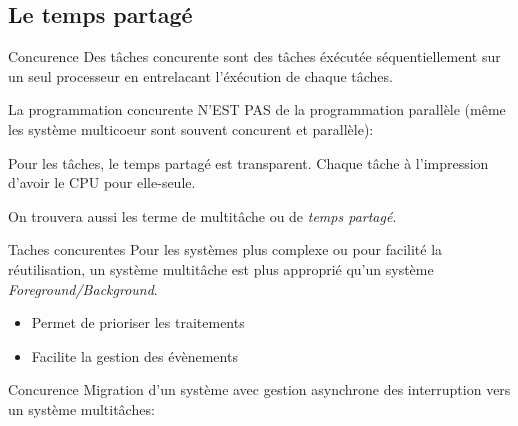 \subsection{Le temps partagé}

\begin{frame}{Concurence}
  Des tâches concurente sont  des tâches éxécutée séquentiellement sur
  un seul processeur en entrelacant l'éxécution de chaque tâches.

  La programmation concurente N'EST  PAS de la programmation parallèle
  (même les système multicoeur sont souvent concurent et parallèle):
  \begin{center}
  \end{center}

  Pour les tâches,  le temps partagé est transparent.  Chaque tâche à
  l'impression d'avoir le CPU pour elle-seule.

  On trouvera aussi les terme de multitâche ou de \emph{temps partagé}.
\end{frame} 

\begin{frame}{Taches concurentes}
  Pour les  systèmes plus complexe ou pour  facilité la réutilisation,
  un   système   multitâche   est   plus   approprié   qu'un   système
  \emph{Foreground/Background}.
  \begin{itemize} 
  \item Permet de prioriser les traitements
  \item Facilite la gestion des évènements
  \end{itemize} 
\end{frame} 

\begin{frame}{Concurence}
  Migration d'un système avec gestion asynchrone des interruption vers
  un système multitâches:
  \begin{center}
  \end{center}
\end{frame} 

